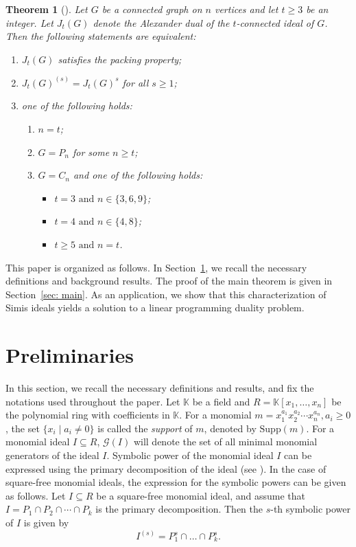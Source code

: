 \documentclass[12pt]{amsart}
\newtheorem{theorem}[proposition]{Theorem}
\begin{document}
\begin{theorem}[]
    Let $G$ be a connected graph on $n$ vertices and let $t\geq 3$ be an integer. Let $J_t(G)$ denote the Alexander dual of the $t$-connected ideal of $G$. Then the following statements are equivalent:
    \begin{enumerate}
        \item $J_t(G)$ satisfies the packing property;
        \item $J_t(G)^{(s)}=J_t(G)^s$ for all $s\geq 1$;
        \item one of the following holds:
        \begin{enumerate}
            \item[(a)] $n=t$;
            \item[(b)] $G=P_n$ for some $n\geq t$;
            \item[(c)] $G=C_n$ and one of the following holds: \begin{itemize}
            \item[(i)] $t=3 \text{ and } n\in \{3,6,9\}$;
            \item[(ii)] $t=4 \text{ and } n\in \{4,8\}$;
            \item[(iii)] $t\geq 5 \text{ and } n=t$.
        \end{itemize}
        \end{enumerate}        
    \end{enumerate}
\end{theorem}

This paper is organized as follows. In Section~\ref{sec: preli}, we recall the necessary definitions and background results. The proof of the main theorem is given in Section~\ref{sec: main}. As an application, we show that this characterization of Simis ideals yields a solution to a linear programming duality problem.

\section{Preliminaries}\label{sec: preli}
In this section, we recall the necessary definitions and results, and fix the notations used throughout the paper. Let $\mathbb{K}$ be a field and $R = \mathbb{K}[x_1,\ldots,x_n]$ be the polynomial ring with coefficients in $\mathbb{K}$. For a monomial $m=x_1^{a_1}x_2^{a_2}\cdots x_n^{a_n}, a_i\geq 0$, the set $\{x_i \mid a_i \neq 0\}$ is called the \emph{support} of $m$, denoted by $\mathrm{Supp}(m)$. For a monomial ideal $I\subseteq R$, $\mathcal{G}(I)$ will denote the set of all minimal monomial generators of the ideal $I$. Symbolic power of the monomial ideal $I$ can be expressed using the primary decomposition of the ideal (see \cite[Theorem 3.7]{CooperEtAl2017}). In the case of square-free monomial ideals, the expression for the symbolic powers can be given as follows. Let $I\subseteq R$ be a square-free monomial ideal, and assume that $I=P_1\cap P_2\cap \cdots \cap P_k$ is the primary decomposition. Then the $s$-th symbolic power of $I$ is given by
\[
I^{(s)} = P_1^s \cap \ldots \cap P_k^s.
\]
\end{document}
